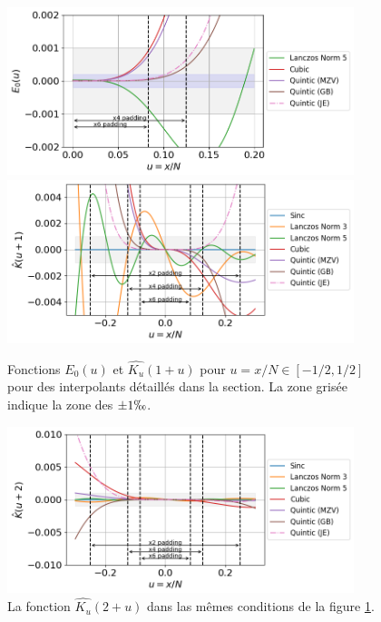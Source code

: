 \documentclass[11pt,twoside]{article}
\begin{document}
\begin{figure}
\centering
\includegraphics[width=0.9\textwidth]{fig15a.png}
\includegraphics[width=0.9\textwidth]{fig15b.png}
\caption{Fonctions $E_0(u)$ et $\widehat{K_u}(1+u)$ pour $u=x/N\in[-1/2,1/2]$ pour des interpolants détaillés dans la section. La zone grisée indique la zone des $\pm 1\permil$.}
\label{fig-E0-et-ghostsfactor}
\end{figure}
%
\begin{figure}
\centering
\includegraphics[width=0.9\textwidth]{fig16.png}
\caption{La fonction $\widehat{K_u}(2+u)$ dans las mêmes conditions de la figure \ref{fig-E0-et-ghostsfactor}.}
\label{fig-2nd-ghostsfactor}
\end{figure}
\end{document}
